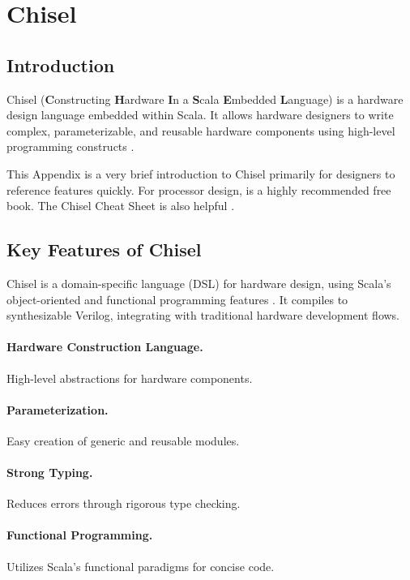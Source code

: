 \section{Chisel}


\subsection{Introduction}
Chisel (\textbf{C}onstructing \textbf{H}ardware \textbf{I}n a \textbf{S}cala \textbf{E}mbedded \textbf{L}anguage) is a hardware design language embedded within Scala. It allows hardware designers to write complex, parameterizable, and reusable hardware components using high-level programming constructs \cite{bachrach2012chisel}. 

This Appendix is a very brief introduction to Chisel primarily for designers to reference features quickly. For processor design, \citep{chisel:book} is a highly recommended free book. The Chisel Cheat Sheet is also helpful \cite{chiselcheatsheet}.

\subsection{Key Features of Chisel}
Chisel is a domain-specific language (DSL) for hardware design, using Scala's object-oriented and functional programming features \cite{chisel-doc}. It compiles to synthesizable Verilog, integrating with traditional hardware development flows.

\paragraph{Hardware Construction Language.} High-level abstractions for hardware components.
\paragraph{Parameterization.} Easy creation of generic and reusable modules.
\paragraph{Strong Typing.} Reduces errors through rigorous type checking.
\paragraph{Functional Programming.} Utilizes Scala's functional paradigms for concise code.


